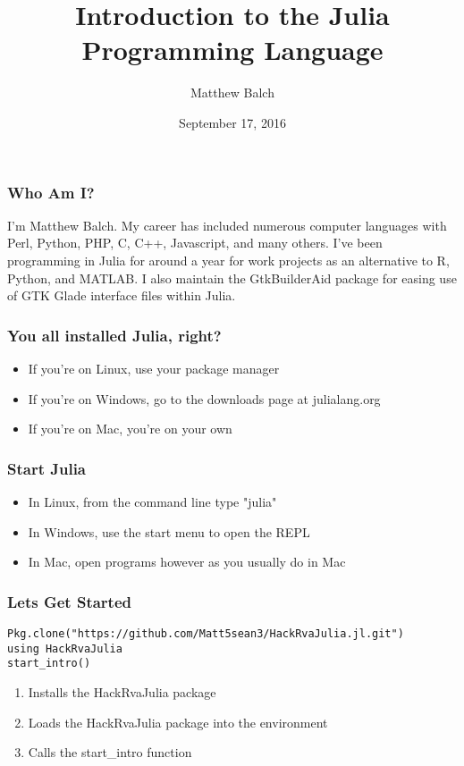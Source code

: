 \documentclass{beamer}
\title[Julia]{Introduction to the Julia Programming Language}
\author{Matthew Balch}
\institute{HackRVA}
\date{September 17, 2016}
\begin{document}
\frame{\titlepage}

\begin{frame}
\frametitle{Who Am I?}
I'm Matthew Balch. My career has included numerous computer languages with 
Perl, Python, PHP, C, C++, Javascript, and many others. I've been programming 
in Julia for around a year for work projects as an alternative to R, Python, and MATLAB.
I also maintain the GtkBuilderAid package for easing use of GTK Glade interface 
files within Julia.

\end{frame}

\begin{frame}
\frametitle{You all installed Julia, right?}
\begin{itemize}
  \item If you're on Linux, use your package manager
  \item If you're on Windows, go to the downloads page at julialang.org
  \item If you're on Mac, you're on your own
\end{itemize}
\end{frame}

\begin{frame}
\frametitle{Start Julia}

\begin{itemize}
  \item In Linux, from the command line type "julia"
  \item In Windows, use the start menu to open the REPL
  \item In Mac, open programs however as you usually do in Mac
\end{itemize}

\end{frame}

\begin{frame}[fragile]
\frametitle{Lets Get Started}

\begin{verbatim}
Pkg.clone("https://github.com/Matt5sean3/HackRvaJulia.jl.git")
using HackRvaJulia
start_intro()
\end{verbatim}

\begin{enumerate}
  \item Installs the HackRvaJulia package
  \item Loads the HackRvaJulia package into the environment
  \item Calls the start\_intro function
\end{enumerate}

\end{frame}
\end{document}
